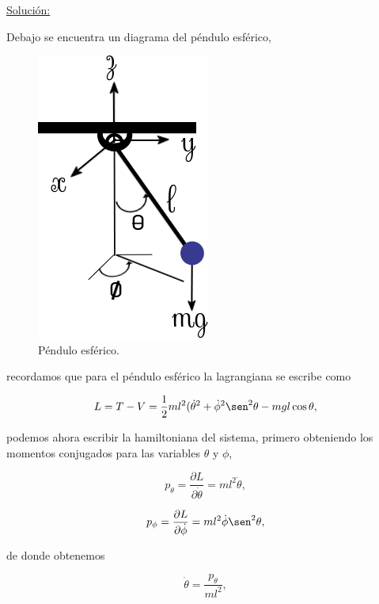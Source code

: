\documentclass[a4paper,10pt]{article}
\numberwithin{equation}{section}
\begin{document}
\vspace{.3cm}

\underline{Solución:} \vspace{.3cm}

Debajo se encuentra un diagrama del péndulo esférico,

\begin{figure}[H]
 \center 
 \includegraphics[scale=0.6]{problema5fig1}
 \caption{Péndulo esférico.}
 \label{fig:problema5fig1}
\end{figure}

recordamos que para el péndulo esférico la lagrangiana se escribe como 

\begin{equation}
 L = T - V = \frac{1}{2}ml^2(\dot{\theta}^2 + \dot{\phi}^2\sen^2{\theta} 
 - mgl\cos{\theta},
\end{equation}

podemos ahora escribir la hamiltoniana del sistema, primero obteniendo los momentos 
conjugados para las variables $\theta$ y $\phi$, 

\begin{equation}
 p_\theta = \frac{\partial L}{\partial \dot{\theta}} = ml^2\dot{\theta},
\end{equation}

\begin{equation}
 p_\phi = \frac{\partial L}{\partial \dot{\phi}} = ml^2\dot{\phi}\sen^2{\theta},
\end{equation}

de donde obtenemos 

\begin{equation}
 \dot{\theta} = \frac{p_\theta}{ml^2},
\end{equation}
\end{document}
